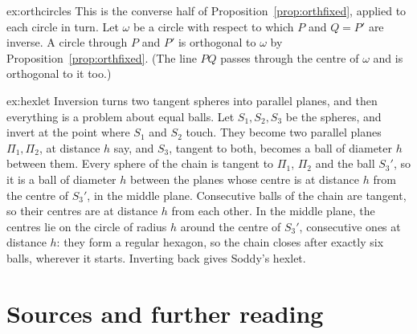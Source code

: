 \begin{solution}{ex:orthcircles}
\idea This is the converse half of Proposition~\ref{prop:orthfixed}, applied to each circle in turn.
\writeup Let $\omega$ be a circle with respect to which $P$ and $Q=P'$ are inverse. A circle through $P$ and $P'$ is orthogonal to $\omega$ by
Proposition~\ref{prop:orthfixed}. (The line $PQ$ passes through the centre of $\omega$ and is orthogonal to it too.)
\end{solution}

\begin{solution}{ex:hexlet}
\idea Inversion turns two tangent spheres into parallel planes, and then everything is a problem about equal balls.
\writeup Let $S_1,S_2,S_3$ be the spheres, and invert at the point where $S_1$ and $S_2$ touch. They become two parallel planes $\Pi_1,\Pi_2$, at
distance $h$ say, and $S_3$, tangent to both, becomes a ball of diameter $h$ between them. Every sphere of the chain is tangent to $\Pi_1$, $\Pi_2$
and the ball $S_3'$, so it is a ball of diameter $h$ between the planes whose centre is at distance $h$ from the centre of $S_3'$, in the middle
plane. Consecutive balls of the chain are tangent, so their centres are at distance $h$ from each other. In the middle plane, the centres lie on
the circle of radius $h$ around the centre of $S_3'$, consecutive ones at distance $h$: they form a regular hexagon, so the chain closes after
exactly six balls, wherever it starts. Inverting back gives Soddy's hexlet.
\end{solution}

\section*{Sources and further reading}

